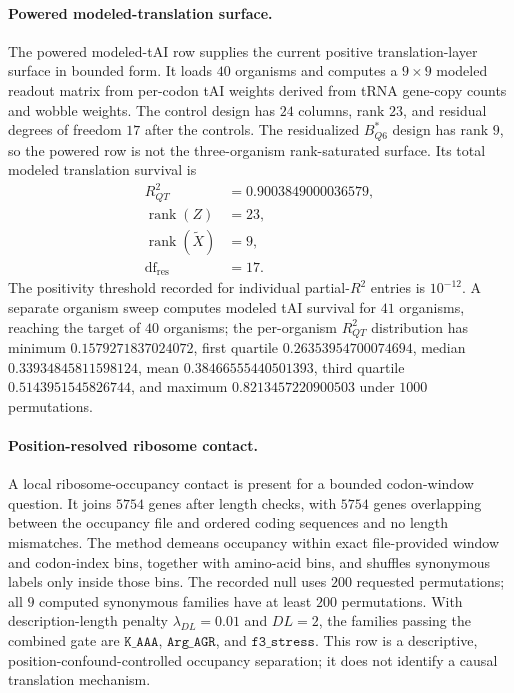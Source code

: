 \paragraph{Powered modeled-translation surface.}
The powered modeled-tAI row supplies the current positive translation-layer surface in bounded form.  It loads $40$ organisms and computes a $9\times 9$ modeled readout matrix from per-codon tAI weights derived from tRNA gene-copy counts and wobble weights.  The control design has $24$ columns, rank $23$, and residual degrees of freedom $17$ after the controls.  The residualized $B^{\ast}_{Q6}$ design has rank $9$, so the powered row is not the three-organism rank-saturated surface.  Its total modeled translation survival is
$$\begin{aligned}
R^2_{QT} &= 0.9003849000036579,\\
\operatorname{rank}(Z) &= 23,\\
\operatorname{rank}(\widetilde X) &= 9,\\
\operatorname{df}_{\mathrm{res}} &= 17.
\end{aligned}$$
The positivity threshold recorded for individual partial-$R^2$ entries is $10^{-12}$.  A separate organism sweep computes modeled tAI survival for $41$ organisms, reaching the target of $40$ organisms; the per-organism $R^2_{QT}$ distribution has minimum $0.1579271837024072$, first quartile $0.26353954700074694$, median $0.33934845811598124$, mean $0.38466555440501393$, third quartile $0.5143951545826744$, and maximum $0.8213457220900503$ under $1000$ permutations.

\paragraph{Position-resolved ribosome contact.}
A local ribosome-occupancy contact is present for a bounded codon-window question.  It joins $5754$ genes after length checks, with $5754$ genes overlapping between the occupancy file and ordered coding sequences and no length mismatches.  The method demeans occupancy within exact file-provided window and codon-index bins, together with amino-acid bins, and shuffles synonymous labels only inside those bins.  The recorded null uses $200$ requested permutations; all $9$ computed synonymous families have at least $200$ permutations.  With description-length penalty $\lambda_{DL}=0.01$ and $DL=2$, the families passing the combined gate are $\texttt{K\_AAA}$, $\texttt{Arg\_AGR}$, and $\texttt{f3\_stress}$.  This row is a descriptive, position-confound-controlled occupancy separation; it does not identify a causal translation mechanism.

